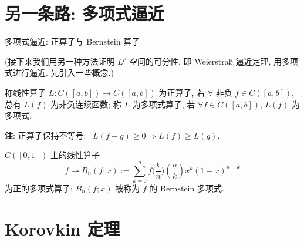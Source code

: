 
\section[正算子]{另一条路: 多项式逼近}


\begin{frame}{多项式逼近: 正算子与 Bernstein 算子}

(接下来我们用\alert{另一种方法}证明 $L^p$ 空间的可分性,
即 Weierstra\ss{} 逼近定理, 用多项式进行逼近. 先引入一些概念.)

\pause

\begin{Def}[正算子与多项式算子]
称线性算子 $L: C([a,b]) \longrightarrow C([a,b])$ 为\alert{正算子},
若 $\forall$ 非负 $f \in C([a,b])$, 总有 $L(f)$ 为非负连续函数;
称 $L$ 为\alert{多项式算子}, 若 $\forall f \in C([a,b])$, $L(f)$ 为多项式.

\vspace{0.3em}
\textbf{注}: 正算子保持不等号: \
$L(f - g) \geqslant 0 \Longrightarrow L(f) \geqslant L(g)$.
\end{Def}

\pause

\begin{eg}[Bernstein 算子]
$C([0,1])$ 上的线性算子
\[
f \longmapsto B_n(f; x) := \sum_{k=0}^{n} f \Big( \frac{k}{n} \Big)
\binom{n}{k} x^k (1 - x)^{n-k}
\]
为\alert{正的多项式算子}; $B_n(f; x)$ 被称为 $f$ 的 \alert{Bernstein 多项式}.
\end{eg}

\end{frame}


\section[Korovkin]{Korovkin 定理}


